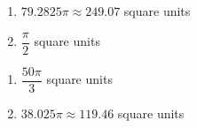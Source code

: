 \documentclass{ximera}
\begin{document}
\begin{multicols}{2}

\begin{enumerate}

\setcounter{enumi}{\value{HW}}

\item $79.2825\pi \approx 249.07$ square units 
\item $\dfrac{\pi}{2}$ square units

\setcounter{HW}{\value{enumi}}

\end{enumerate}

\end{multicols}

\enlargethispage{0.25in}

\vspace{-0.25in}

\begin{multicols}{2}

\begin{enumerate}

\setcounter{enumi}{\value{HW}}

\item $\dfrac{50\pi}{3}$ square units
\item $38.025 \pi \approx 119.46$ square units 

\end{enumerate}

\end{multicols}
\end{document}
